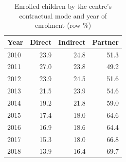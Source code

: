 \begin{table}[htbp]\centering
\caption{Enrolled children by the centre's contractual mode and year of enrolment (row \%)}
\label{tab:T5c_modal}
\footnotesize
\begin{tabular}{lrrr}
\toprule
Year & Direct & Indirect & Partner \\
\midrule
2010 & 23.9 & 24.8 & 51.3 \\
2011 & 27.0 & 23.8 & 49.2 \\
2012 & 23.9 & 24.5 & 51.6 \\
2013 & 21.5 & 23.9 & 54.6 \\
2014 & 19.2 & 21.8 & 59.0 \\
2015 & 17.4 & 18.0 & 64.6 \\
2016 & 16.9 & 18.6 & 64.4 \\
2017 & 15.3 & 18.0 & 66.8 \\
2018 & 13.9 & 16.4 & 69.7 \\
\bottomrule
\end{tabular}
\end{table}

